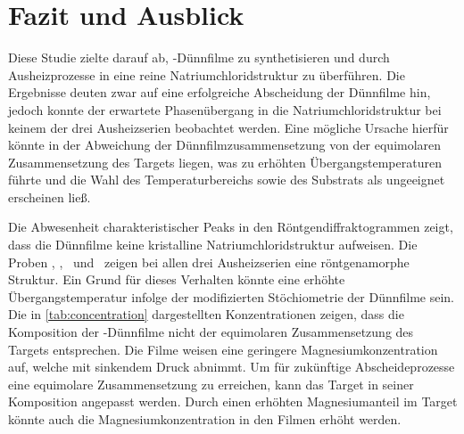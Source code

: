 \section{Fazit und Ausblick}\label{sec:fazit-und-ausblick}
Diese Studie zielte darauf ab, \heo-Dünnfilme zu synthetisieren und durch Ausheizprozesse in eine reine
Natriumchloridstruktur zu überführen.
Die Ergebnisse deuten zwar auf eine erfolgreiche Abscheidung der Dünnfilme hin, jedoch konnte der erwartete
Phasenübergang in die Natriumchloridstruktur bei keinem der drei Ausheizserien beobachtet werden.
Eine mögliche Ursache hierfür könnte in der Abweichung der Dünnfilmzusammensetzung von der equimolaren Zusammensetzung
des Targets liegen, was zu erhöhten Übergangstemperaturen führte und die Wahl des Temperaturbereichs sowie des Substrats
als ungeeignet erscheinen ließ.

Die Abwesenheit charakteristischer Peaks in den Röntgendiffraktogrammen zeigt, dass die Dünnfilme keine kristalline
Natriumchloridstruktur aufweisen.
Die Proben \samplethree, \sampleone, \sampletwo\ und \samplefour\ zeigen bei allen drei Ausheizserien eine röntgenamorphe Struktur.
Ein Grund für dieses Verhalten könnte eine erhöhte Übergangstemperatur infolge der modifizierten Stöchiometrie der
Dünnfilme sein.
Die in \cref{tab:concentration} dargestellten Konzentrationen zeigen, dass die Komposition der \heo-Dünnfilme nicht der
equimolaren Zusammensetzung des Targets entsprechen.
Die Filme weisen eine geringere Magnesiumkonzentration auf, welche mit sinkendem Druck abnimmt.
Um für zukünftige Abscheideprozesse eine equimolare Zusammensetzung zu erreichen, kann das Target in seiner
Komposition angepasst werden.
Durch einen erhöhten Magnesiumanteil im Target könnte auch die Magnesiumkonzentration in den Filmen erhöht werden.


